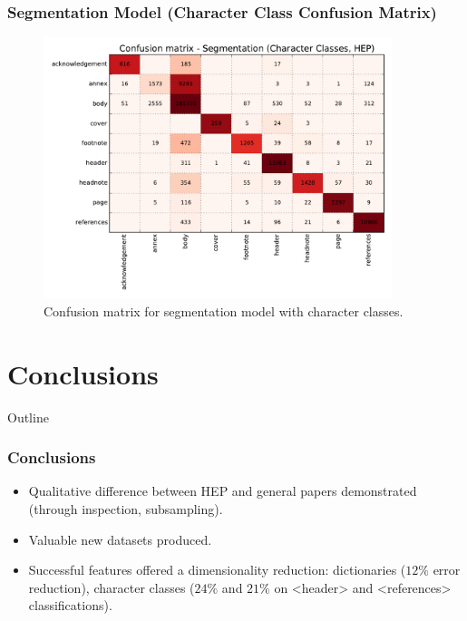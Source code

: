 \documentclass{beamer}
\begin{document}
\begin{frame}
\frametitle{Segmentation Model (Character Class Confusion Matrix)}
\begin{figure}[h]
\center
\includegraphics[width=4in]{Figures/classes_confusion_segmentation.pdf}
\caption{Confusion matrix for segmentation model with character classes.}
\end{figure}
\end{frame}


\section{Conclusions}


\begin{frame}[noframenumbering]{Outline}
\end{frame}


\begin{frame}
\frametitle{Conclusions}
\begin{itemize}
\item Qualitative difference between HEP and general papers demonstrated (through inspection, subsampling).
\item Valuable new datasets produced.
\item Successful features offered a dimensionality reduction: dictionaries ($12\%$ error reduction), character classes ($24\%$ and $21\%$ on <header> and <references> classifications).
\end{itemize}
\end{frame}


\end{document}
